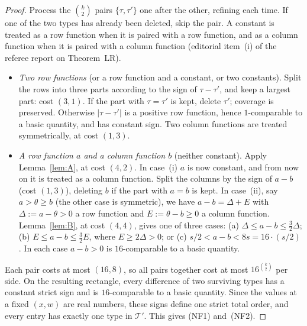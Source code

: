 \begin{proof}
Process the $\binom k2$ pairs $\{\tau,\tau'\}$ one after the other, refining each time. If one of the two types
has already been deleted, skip the pair. A constant is treated as a row function when it is paired with a row
function, and as a column function when it is paired with a column function (editorial item~(i) of the referee report on Theorem~LR).
\begin{itemize}[leftmargin=1.5em]
\item \emph{Two row functions} (or a row function and a constant, or two constants). Split the rows into three
  parts according to the sign of $\tau-\tau'$, and keep a largest part: cost $(3,1)$. If the part with
  $\tau=\tau'$ is kept, delete $\tau'$; coverage is preserved. Otherwise $|\tau-\tau'|$ is a positive row
  function, hence $1$-comparable to a basic quantity, and has constant sign. Two column functions are treated
  symmetrically, at cost $(1,3)$.
\item \emph{A row function $a$ and a column function $b$} (neither constant). Apply Lemma~\ref{lem:A}, at cost
  $(4,2)$. In case~(i) $a$ is now constant, and from now on it is treated as a column function. Split the
  columns by the sign of $a-b$ (cost $(1,3)$), deleting $b$ if the part with $a=b$ is kept. In case~(ii), say
  $a>\theta\ge b$ (the other case is symmetric), we have $a-b=\Delta+E$ with $\Delta:=a-\theta>0$ a row
  function and $E:=\theta-b\ge0$ a column function. Lemma~\ref{lem:B}, at cost $(4,4)$, gives one of three
  cases: (a) $\Delta\le a-b\le\frac32\Delta$; (b) $E\le a-b\le\frac32E$, where $E\ge2\Delta>0$; or
  (c) $s/2<a-b<8s=16\cdot(s/2)$. In each case $a-b>0$ is $16$-comparable to a basic quantity.
\end{itemize}
Each pair costs at most $(16,8)$, so all pairs together cost at most $16^{\binom k2}$ per side. On the
resulting rectangle, every difference of two surviving types has a constant strict sign and is $16$-comparable to
a basic quantity. Since the values at a fixed $(x,w)$ are real numbers, these signs define one strict total
order, and every entry has exactly one type in $\mathcal T'$. This gives (NF1) and~(NF2).


\end{proof}
